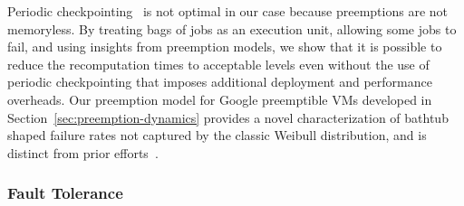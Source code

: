 Periodic checkpointing~\cite{dongarra_fault_nodate} is not optimal in our case because preemptions are not memoryless. 
By treating bags of jobs as an execution unit, allowing some jobs to fail, and using insights from preemption models, we show that it is possible to reduce the recomputation times to acceptable levels even without the  use of periodic  checkpointing that imposes additional deployment and performance overheads. 
Our preemption model for Google preemptible VMs developed in Section~\ref{sec:preemption-dynamics} provides a novel characterization of bathtub shaped failure rates not captured by the classic Weibull distribution, and is distinct from prior efforts~\cite{mudholkar1993exponentiated, crevecoeur1993model}. 


\vspace*{\subsecspace}
\subsubsection{Fault Tolerance}




